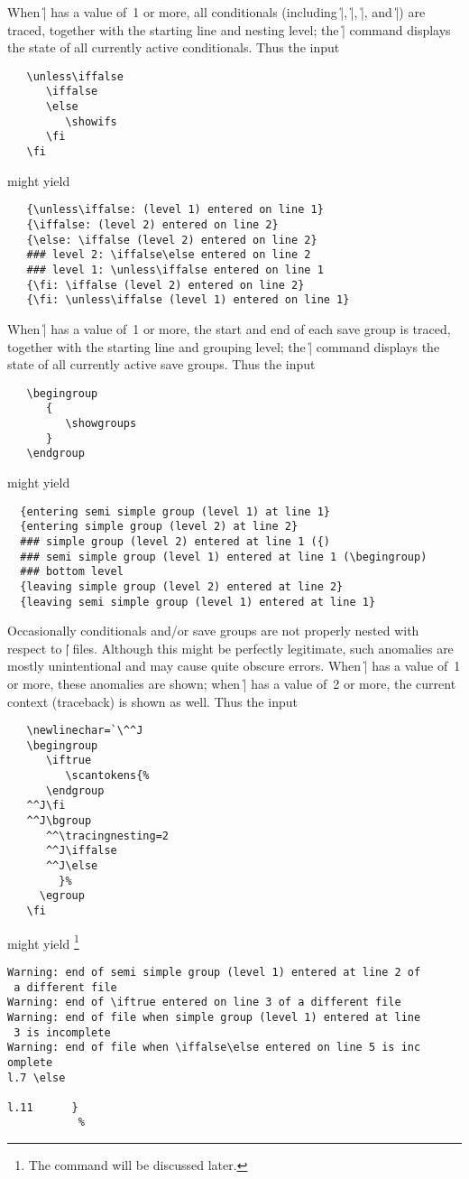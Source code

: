 \documentclass{article}
\begin{document}
When \|\tracingifs| has a value of~1 or more, all conditionals
(including \|\unless|, \|\or|, \|\else|, and \|\fi|) are traced, together
with the starting line and nesting level; the \|\showifs| command displays
the state of all currently active conditionals. Thus the input
\begin{verbatim}
   \unless\iffalse
      \iffalse
      \else
         \showifs
      \fi
   \fi
\end{verbatim}
might yield
\begin{verbatim}
   {\unless\iffalse: (level 1) entered on line 1}
   {\iffalse: (level 2) entered on line 2}
   {\else: \iffalse (level 2) entered on line 2}
   ### level 2: \iffalse\else entered on line 2
   ### level 1: \unless\iffalse entered on line 1
   {\fi: \iffalse (level 2) entered on line 2}
   {\fi: \unless\iffalse (level 1) entered on line 1}
\end{verbatim}

When \|\tracinggroups| has a value of~1 or more, the start and end of
each save group is traced, together with the starting line and grouping
level; the \|\showgroups| command displays the state of all currently
active save groups. Thus the input
\begin{verbatim}
   \begingroup
      {
         \showgroups
      }
   \endgroup
\end{verbatim}
might yield
\begin{verbatim}
  {entering semi simple group (level 1) at line 1}
  {entering simple group (level 2) at line 2}
  ### simple group (level 2) entered at line 1 ({)
  ### semi simple group (level 1) entered at line 1 (\begingroup)
  ### bottom level
  {leaving simple group (level 2) entered at line 2}
  {leaving semi simple group (level 1) entered at line 1}
\end{verbatim}

Occasionally conditionals and/or save groups are not properly nested
with respect to \|| files.  Although this might be perfectly
legitimate, such anomalies are mostly unintentional and may cause quite
obscure errors.  When \|\tracingnesting| has a value of~1 or more,
these anomalies are shown; when \|\tracingnesting| has a value of~2 or more,
the current context (traceback) is shown as well. Thus the input
\begin{verbatim}
   \newlinechar=`\^^J
   \begingroup
      \iftrue
         \scantokens{%
      \endgroup
   ^^J\fi
   ^^J\bgroup
      ^^\tracingnesting=2
      ^^J\iffalse
      ^^J\else
        }%
     \egroup
   \fi
\end{verbatim}
might yield%
\footnote{The  command will be discussed later.}
\begin{verbatim}
Warning: end of semi simple group (level 1) entered at line 2 of
 a different file
Warning: end of \iftrue entered on line 3 of a different file
Warning: end of file when simple group (level 1) entered at line
 3 is incomplete
Warning: end of file when \iffalse\else entered on line 5 is inc
omplete
l.7 \else

l.11      }
           %
\end{verbatim}
\end{document}
